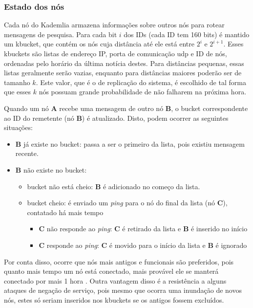 
\subsubsection*{Estado dos nós}

Cada nó do Kademlia armazena informações sobre outros nós para rotear mensagens de
pesquisa. Para cada bit $i$ dos IDs (cada ID tem 160 bits) é mantido um \gls{kbucket},
que contém os nós cuja distância até ele está entre $2^i$ e $2^{i+1}$. Esses
\glspl*{kbucket} são listas de endereço IP, porta de comunicação \gls*{udp} e ID de
nós, ordenadas pelo horário da última notícia destes. Para distâncias pequenas, essas
listas geralmente serão vazias, enquanto para distâncias maiores poderão ser de tamanho
$k$. Este valor, que é o de replicação do sistema, é escolhido de tal forma que esses
$k$ nós possuam grande probabilidade de não falharem na próxima hora.

Quando um nó \textbf{A} recebe uma mensagem de outro nó \textbf{B}, o \gls*{bucket}
correspondente ao ID do remetente (nó \textbf{B}) é atualizado. Disto, podem ocorrer as
seguintes situações:

\begin{itemize}
    \item \textbf{B} já existe no \gls*{bucket}: passa a ser o primeiro da lista, pois
        existiu mensagem recente.

    \item \textbf{B} não existe no \gls*{bucket}:
        \begin{itemize}
            \item \gls*{bucket} não está cheio: \textbf{B} é adicionado no começo da
                lista.
            \item \gls*{bucket} cheio: é enviado um \emph{ping} para o nó do final da
                lista (nó \textbf{C}), contatado há mais tempo

            \begin{itemize}
                \item \textbf{C} não responde ao \emph{ping}: \textbf{C} é retirado da
                lista e \textbf{B} é inserido no início
                \item \textbf{C} responde ao \emph{ping}: \textbf{C} é movido para o
                início da lista e \textbf{B} é ignorado
            \end{itemize}
        \end{itemize}

\end{itemize}

Por conta disso, ocorre que nós mais antigos e funcionais são preferidos, pois quanto
mais tempo um nó está conectado, mais provável ele se manterá conectado por mais 1 hora
\cite{artigo:gnutella-uptime}. Outra vantagem disso é a resistência a alguns ataques de
negação de serviço, pois mesmo que ocorra uma inundação de novos nós, estes só seriam
inseridos nos \glspl*{kbucket} se os antigos fossem excluídos.